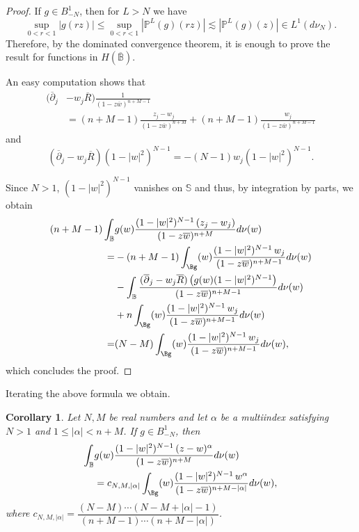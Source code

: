 \documentclass[12pt,twoside,leqno,final]{amsart}
\theoremstyle{plain}
\newtheorem{cor}[thm]{Corollary}
\begin{document}
\begin{proof}
If $g\in B^1_{-N}$, then for $L>N$ we have 
$$
\sup_{0<r<1} |g(rz)|\le \sup_{0<r<1} |{\mathbb{P}}^{L}(g)(rz)|\lesssim |{\mathbb{P}}^{L}(g)(z)|\in L^1(d\nu_N).
$$ 
Therefore, by the dominated convergence theorem, it is enough to prove the result for 
functions in $H(\overline {{\mathbb B}})$.

An easy computation shows that
\begin{align*}
(\overline{\partial}_j&-w_j\overline R)
\frac{1}{(1-z\overline w)^{n+M-1}}\\
&=(n+M-1)\frac{z_j-w_j}{(1-z\overline w)^{n+M}}+(n+M-1)\frac{w_j}{(1-z\overline w)^{n+M-1}}
\end{align*} 
and
$$
(\overline{\partial}_j-w_j\overline R)(1-|w|^2)^{N-1}=-(N-1)w_j(1-|w|^2)^{N-1}.
$$

Since $N>1$, $(1-|w|^2)^{N-1}$ vanishes on ${{\mathbb S}}$ and thus, by integration by parts, we obtain
\begin{align*}
(n+M-1)\int_{{\mathbb B}}&g(w)\frac{(1-|w|^2)^{N-1}\,(z_j-w_j)}{(1-z\overline w)^{n+M}}d\nu(w)\\
=&-(n+M-1)\int_\Bg(w)\frac{(1-|w|^2)^{N-1}\, w_j}{(1-z\overline w)^{n+M-1}}d\nu(w)\\
&-\int_{{\mathbb B}} \frac{(\overline{\partial}_j-w_j\overline R)\left(g(w)(1-|w|^2)^{N-1}\right)}
{(1-z\overline w)^{n+M-1}}d\nu(w)\\
&+n\int_\Bg(w)\frac{(1-|w|^2)^{N-1}\, w_j}{(1-z\overline w)^{n+M-1}}d\nu(w)\\
=&(N-M)\int_\Bg(w)\frac{(1-|w|^2)^{N-1}\, w_j}{(1-z\overline w)^{n+M-1}}d\nu(w),
\end{align*}
which concludes the proof.
\end{proof}

Iterating the above formula we obtain.

\begin{cor} \label{cor:intparts}
Let $N,M$ be real numbers and let  $\alpha$ be a multiindex satisfying  $N>1$ and  $1\le |\alpha|<n+M$. 
If $g\in B^1_{-N}$, then
\begin{align*}
\int_{{\mathbb B}}&g(w)\frac{(1-|w|^2)^{N-1}\,(z-w)^\alpha}{(1-z\overline w)^{n+M}}d\nu(w)\\
&=c_{N,M,|\alpha|}\int_\Bg(w)\frac{(1-|w|^2)^{N-1}\, w^\alpha}{(1-z\overline w)^{n+M-|\alpha|}}d\nu(w),
\end{align*}
where $c_{N,M,|\alpha|}=\dfrac{(N-M)\cdots(N-M+|\alpha|-1)}{(n+M-1)\cdots(n+M-|\alpha|)}$.
\end{cor}
\end{document}
